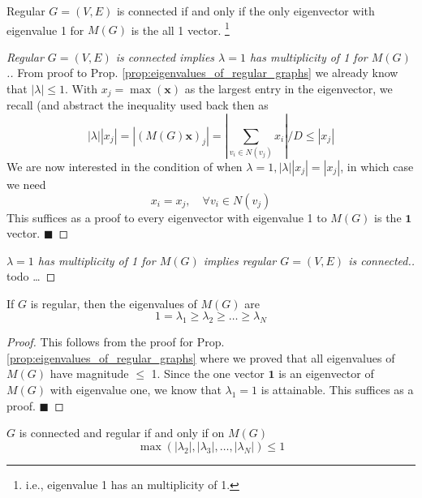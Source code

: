 \documentclass[11pt, letter]{book}
\newcommand{\bx}{\mathbf{x}}
\newcommand{\qed}{\hfill $\blacksquare$}
\begin{document}
\begin{proposition}
	Regular $G = (V, E)$ is connected if and only if the only eigenvector with eigenvalue 1 for $M(G)$ is the all 1 vector. \footnote{i.e., eigenvalue 1 has an multiplicity of 1.}
\end{proposition}

\begin{proof} [Regular $G = (V, E)$ is connected implies $\lambda = 1$ has multiplicity of 1 for $M(G)$.]
	From proof to Prop. \ref{prop:eigenvalues_of_regular_graphs} we already know that $|\lambda| \leq 1$. With $x_j = \max(\bx)$ as the largest entry in the eigenvector, we recall (and abstract the inequality used back then as
	\begin{equation}
		|\lambda||x_j| = |(M(G)\bx)_j| = \left| \sum_{v_i \in N(v_j)} x_i \right| / D \leq |x_j| 
	\end{equation}
	We are now interested in the condition of when $\lambda = 1, |\lambda| |x_j| = |x_j|$, in which case we need 
	\begin{equation}
		x_i = x_j, \quad \forall v_i \in N(v_j)
	\end{equation}
	This suffices as a proof to every eigenvector with eigenvalue 1 to $M(G)$ is the $\mathbf 1$ vector. \qed
\end{proof}

\begin{proof} [$\lambda = 1$ has multiplicity of 1 for $M(G)$ implies regular $G = (V, E)$ is connected.]
	todo \dots
\end{proof}

\begin{proposition}
	If $G$ is regular, then the eigenvalues of $M(G)$ are 
	\begin{equation}
		1 = \lambda_1 \geq \lambda_2 \geq \dots \geq \lambda_N
	\end{equation}
\end{proposition}

\begin{proof}
	This follows from the proof for Prop. \ref{prop:eigenvalues_of_regular_graphs} where we proved that all eigenvalues of $M(G)$ have magnitude $\leq$ 1. Since the one vector $\mathbf 1$ is an eigenvector of $M(G)$ with eigenvalue one, we know that $\lambda_1 = 1$ is attainable. This suffices as a proof. \qed
\end{proof}

\begin{proposition}
	$G$ is connected and regular if and only if on $M(G)$
	\begin{equation}
		\max ( |\lambda_2| , |\lambda_3|, \dots, |\lambda_N|) \leq 1
	\end{equation}
\end{proposition}
\end{document}
